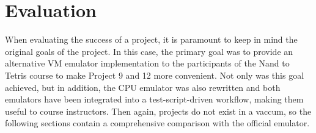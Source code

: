 \section{Evaluation} \label{evaluation}
When evaluating the success of a project, it is paramount to keep in mind the original goals of the project.
In this case, the primary goal was to provide an alternative VM emulator implementation to the participants of the Nand to Tetris course to make Project 9 and 12 more convenient.
Not only was this goal achieved, but in addition, the CPU emulator was also rewritten and both emulators have been integrated into a test-script-driven workflow, making them useful to course instructors.
Then again, projects do not exist in a vaccum, so the following sections contain a comprehensive comparison with the official emulator.

